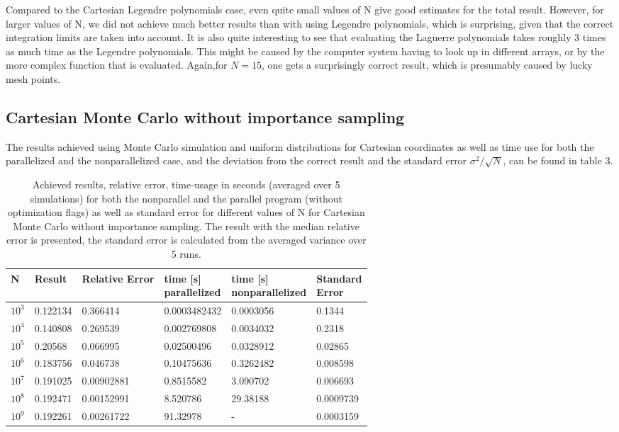 \documentclass[10pt,a4paper]{article}
\begin{document}
Compared to the Cartesian Legendre polynomials case, even quite small values of N give good estimates for the total result. However, for larger values of N, we did not achieve much better results than with using Legendre polynomials, which is surprising, given that the correct integration limits are taken into account. It is also quite interesting to see that evaluating the Laguerre polynomials takes roughly 3 times as much time as the Legendre polynomials. This might be caused by the computer system having to look up in different arrays, or by the more complex function that is evaluated. Again,for $N=15$, one gets a surprisingly correct result, which is presumably caused by lucky mesh points.
\subsection{Cartesian Monte Carlo without importance sampling}
The results achieved using Monte Carlo simulation and uniform distributions for Cartesian coordinates as well as time use for both the parallelized and the nonparallelized case, and the deviation from the correct result and the standard error $\sigma^2/\sqrt{N}$, can be found in table 3.

\begin{table}[H]
\caption[Cartesian Monte Carlo without importance sampling]{Achieved results, relative error, time-usage in seconds (averaged over 5 simulations) for both the nonparallel and the parallel program (without optimization flags) as well as standard error for different values of N for Cartesian Monte Carlo without importance sampling. The result with the median relative error is presented, the standard error is calculated from the averaged variance over 5 runs.}
\begin{tabular}{|l|l|l|l|l|l|}
\hline
N          & Result   & Relative Error & \pbox{10cm}{time {[}s{]}\\ parallelized}  &  \pbox{10cm}{time {[}s{]}\\ nonparallelized} &  \pbox{10cm}{Standard\\ Error} \\ \hline
$10^3$ & 0.122134 & 0.366414   & 0.0003482432 & 0.0003056 & 0.1344    \\ \hline
$10^4$ & 0.140808 & 0.269539   & 0.002769808  & 0.0034032 & 0.2318    \\ \hline
$10^5$ & 0.20568  & 0.066995   & 0.02500496   & 0.0328912 & 0.02865   \\ \hline
$10^6$ & 0.183756 & 0.046738   & 0.10475636   & 0.3262482 & 0.008598  \\ \hline
$10^7$ & 0.191025 & 0.00902881 & 0.8515582    & 3.090702  & 0.006693  \\ \hline
$10^8$ & 0.192471 & 0.00152991 & 8.520786     & 29.38188  & 0.0009739 \\ \hline
$10^9$ & 0.192261 & 0.00261722 & 91.32978     & -         & 0.0003159 \\ \hline
\end{tabular}
\end{table}
\end{document}
